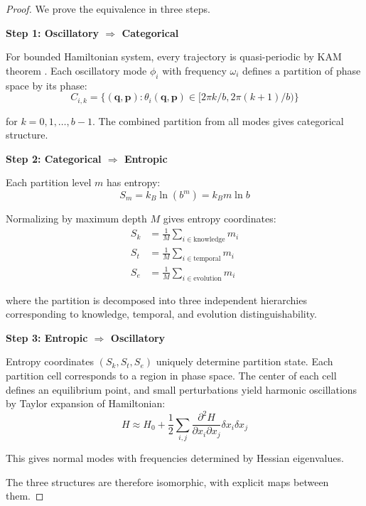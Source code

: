 \documentclass[twocolumn,10pt]{article}
\begin{document}
\begin{proof}
We prove the equivalence in three steps.

\textbf{Step 1: Oscillatory $\Rightarrow$ Categorical}

For bounded Hamiltonian system, every trajectory is quasi-periodic by KAM theorem \cite{Kolmogorov1954}. Each oscillatory mode $\phi_i$ with frequency $\omega_i$ defines a partition of phase space by its phase:
\begin{equation}
C_{i,k} = \{(\mathbf{q}, \mathbf{p}) : \theta_i(\mathbf{q}, \mathbf{p}) \in [2\pi k/b, 2\pi(k+1)/b)\}
\end{equation}

for $k = 0, 1, \ldots, b-1$. The combined partition from all modes gives categorical structure.

\textbf{Step 2: Categorical $\Rightarrow$ Entropic}

Each partition level $m$ has entropy:
\begin{equation}
S_m = k_B \ln(b^m) = k_B m \ln b
\end{equation}

Normalizing by maximum depth $M$ gives entropy coordinates:
\begin{align}
S_k &= \frac{1}{M}\sum_{i \in \text{knowledge}} m_i \\
S_t &= \frac{1}{M}\sum_{i \in \text{temporal}} m_i \\
S_e &= \frac{1}{M}\sum_{i \in \text{evolution}} m_i
\end{align}

where the partition is decomposed into three independent hierarchies corresponding to knowledge, temporal, and evolution distinguishability.

\textbf{Step 3: Entropic $\Rightarrow$ Oscillatory}

Entropy coordinates $(S_k, S_t, S_e)$ uniquely determine partition state. Each partition cell corresponds to a region in phase space. The center of each cell defines an equilibrium point, and small perturbations yield harmonic oscillations by Taylor expansion of Hamiltonian:
\begin{equation}
H \approx H_0 + \frac{1}{2}\sum_{i,j} \frac{\partial^2 H}{\partial x_i \partial x_j}\delta x_i \delta x_j
\end{equation}

This gives normal modes with frequencies determined by Hessian eigenvalues.

The three structures are therefore isomorphic, with explicit maps between them.
\end{proof}
\end{document}
